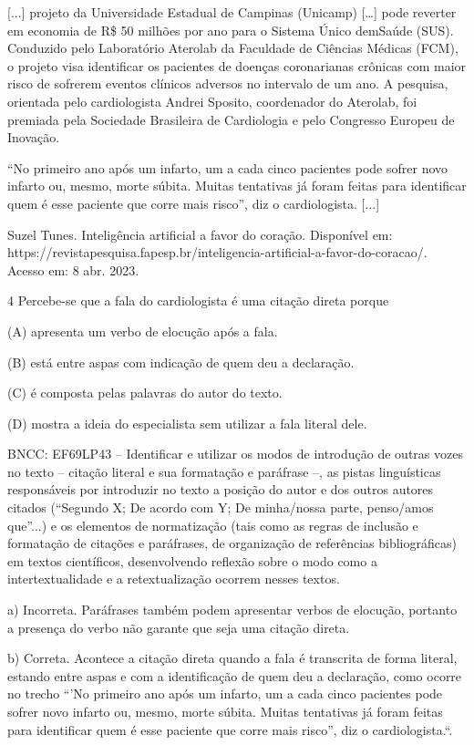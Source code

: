 \begin{itemize}
\begin{itemize}
\begin{escolha}
\begin{escolha}
\begin{escolha}
\begin{escolha}
\begin{escolha}
{[}...{]} projeto da Universidade Estadual de Campinas (Unicamp)
{[}\ldots{}{]} pode reverter em economia de R\$ 50 milhões por ano para
o Sistema Único demSaúde (SUS). Conduzido pelo Laboratório Aterolab da
Faculdade de Ciências Médicas (FCM), o projeto visa identificar os
pacientes de doenças coronarianas crônicas com maior risco de sofrerem
eventos clínicos adversos no intervalo de um ano. A pesquisa, orientada
pelo cardiologista Andrei Sposito, coordenador do Aterolab, foi premiada
pela Sociedade Brasileira de Cardiologia e pelo Congresso Europeu de
Inovação.

``No primeiro ano após um infarto, um a cada cinco pacientes pode sofrer
novo infarto ou, mesmo, morte súbita. Muitas tentativas já foram feitas
para identificar quem é esse paciente que corre mais risco'', diz o
cardiologista. {[}...{]}

Suzel Tunes. Inteligência artificial a favor do coração. Disponível em:
https://revistapesquisa.fapesp.br/inteligencia-artificial-a-favor-do-coracao/.
Acesso em: 8 abr. 2023.

\num {4} Percebe-se que a fala do cardiologista é uma citação direta
porque

(A) apresenta um verbo de elocução após a fala.

(B) está entre aspas com indicação de quem deu a declaração.

(C) é composta pelas palavras do autor do texto.

(D) mostra a ideia do especialista sem utilizar a fala literal dele.

BNCC: EF69LP43 -- Identificar e utilizar os modos de introdução de
outras vozes no texto -- citação literal e sua formatação e paráfrase
--, as pistas linguísticas responsáveis por introduzir no texto a
posição do autor e dos outros autores citados (``Segundo X; De acordo
com Y; De minha/nossa parte, penso/amos que''...) e os elementos de
normatização (tais como as regras de inclusão e formatação de citações e
paráfrases, de organização de referências bibliográficas) em textos
científicos, desenvolvendo reflexão sobre o modo como a
intertextualidade e a retextualização ocorrem nesses textos.

a) Incorreta. Paráfrases também podem apresentar verbos de elocução,
portanto a presença do verbo não garante que seja uma citação direta.

b) Correta. Acontece a citação direta quando a fala é transcrita de
forma literal, estando entre aspas e com a identificação de quem deu a
declaração, como ocorre no trecho ``'No primeiro ano após um infarto, um
a cada cinco pacientes pode sofrer novo infarto ou, mesmo, morte súbita.
Muitas tentativas já foram feitas para identificar quem é esse paciente
que corre mais risco'', diz o cardiologista.``.


\end{escolha}
\end{escolha}
\end{escolha}
\end{escolha}
\end{escolha}
\end{itemize}
\end{itemize}
